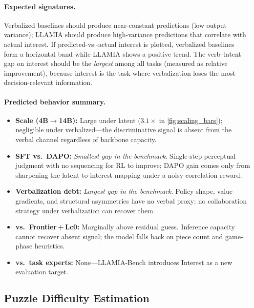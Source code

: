 \paragraph{Expected signatures.}
Verbalized baselines should produce near-constant predictions (low output
variance); LLAMIA should produce high-variance predictions that correlate
with actual interest.
If predicted-vs.-actual interest is plotted, verbalized baselines form a
horizontal band while LLAMIA shows a positive trend.
The verb--latent gap on interest should be the \emph{largest} among all tasks
(measured as relative improvement), because interest is the task where
verbalization loses the most decision-relevant information.

\paragraph{Predicted behavior summary.}
\begin{itemize}[leftmargin=*, itemsep=2pt, topsep=2pt]
\item \textbf{Scale (4B${\to}$14B):} Large under latent
  ($3.1{\times}$ in \cref{fig:scaling_bars}); negligible under
  verbalized---the discriminative signal is absent from the verbal
  channel regardless of backbone capacity.
\item \textbf{SFT vs.\ DAPO:} \emph{Smallest gap in the benchmark}.
  Single-step perceptual judgment with no sequencing for RL to improve;
  DAPO gain comes only from sharpening the latent-to-interest mapping
  under a noisy correlation reward.
\item \textbf{Verbalization debt:} \emph{Largest gap in the benchmark}.
  Policy shape, value gradients, and structural asymmetries have no
  verbal proxy; no collaboration strategy under verbalization can
  recover them.
\item \textbf{vs.\ Frontier\,+\,Lc0:} Marginally above residual guess.
  Inference capacity cannot recover absent signal; the model falls back
  on piece count and game-phase heuristics.
\item \textbf{vs.\ task experts:} None---LLAMIA-Bench introduces
  Interest as a new evaluation target.
\end{itemize}

\subsection{Puzzle Difficulty Estimation}
\label{sec:app_landscape_difficulty}

